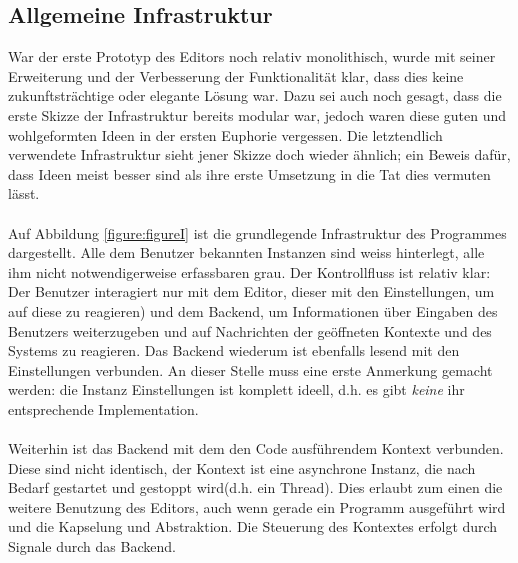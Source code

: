 \subsection{Allgemeine Infrastruktur}
    War der erste Prototyp des Editors noch relativ monolithisch, wurde mit seiner Erweiterung und der Verbesserung der Funktionalität klar,
    dass dies keine zukunftsträchtige oder elegante Lösung war. Dazu sei auch noch gesagt, dass die erste Skizze der Infrastruktur bereits modular
    war, jedoch waren diese guten und wohlgeformten Ideen in der ersten Euphorie vergessen. Die letztendlich verwendete Infrastruktur sieht jener
    Skizze doch wieder ähnlich; ein Beweis dafür, dass Ideen meist besser sind als ihre erste Umsetzung in die Tat dies vermuten lässt.
\paragraph{}
    Auf Abbildung \ref{figure:figureI} ist die grundlegende Infrastruktur des Programmes dargestellt. Alle dem Benutzer bekannten Instanzen sind weiss
    hinterlegt, alle ihm nicht notwendigerweise erfassbaren grau. Der Kontrollfluss ist relativ klar: Der Benutzer interagiert nur mit dem Editor,
    dieser mit den Einstellungen, um auf diese zu reagieren) und dem Backend, um Informationen über Eingaben des Benutzers weiterzugeben und auf Nachrichten
    der geöffneten Kontexte und des Systems zu reagieren. Das Backend wiederum ist ebenfalls lesend mit den Einstellungen verbunden. An dieser Stelle muss
    eine erste Anmerkung gemacht werden: die Instanz Einstellungen ist komplett ideell, d.h. es gibt \textit{keine} ihr entsprechende Implementation.
\paragraph{}
    Weiterhin ist das Backend mit dem den Code ausführendem Kontext verbunden. Diese sind nicht identisch, der Kontext ist eine asynchrone Instanz,
    die nach Bedarf gestartet und gestoppt wird(d.h. ein Thread). Dies erlaubt zum einen die weitere Benutzung des Editors, auch wenn gerade ein Programm
    ausgeführt wird und die Kapselung und Abstraktion. Die Steuerung des Kontextes erfolgt durch Signale durch das Backend.
